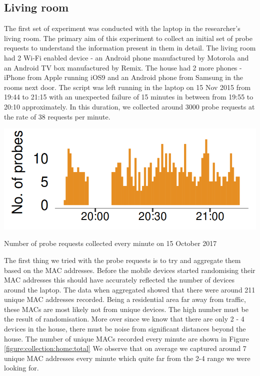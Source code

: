 \subsection{Living room}
The first set of experiment was conducted with the laptop in the researcher's living room.
The primary aim of this experiment to collect an initial set of probe requests to understand the information present in them in detail.
The living room had 2 Wi-Fi enabled device - an Android phone manufactured by Motorola and an Android TV box manufactured by Remix.
The house had 2 more phones - iPhone from Apple running iOS9 and an Android phone from Samsung in the rooms next door.
The script was left running in the laptop on 15 Nov 2015 from 19:44 to 21:15 with an unexpected failure of 15 minutes in between from 19:55 to 20:10 approximately.
In this duration, we collected around 3000 probe requests at the rate of 38 requests per minute.

\begin{marginfigure}
  \includegraphics{images/home-total-count.png}
  \caption{Number of probe requests collected every minute on 15 October 2017}
  \label{figure:collection:home:total}
\end{marginfigure}

The first thing we tried with the probe requests is to try and aggregate them based on the MAC addresses.
Before the mobile devices started randomising their MAC addresses this should have accurately reflected the number of devices around the laptop.
The data when aggregated showed that there were around 211 unique MAC addresses recorded.
Being a residential area far away from traffic, these MACs are most likely not from unique devices.
The high number must be the result of randomisation.
More over since we know that there are only 2 - 4 devices in the house, there must be noise from significant distances beyond the house.
The number of unique MACs recorded every minute are shown in Figure \ref{figure:collection:home:total}
We observe that on average we captured around 7 unique MAC addresses every minute which quite far from the 2-4 range we were looking for.

